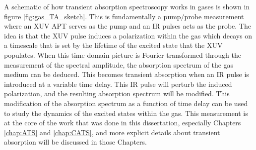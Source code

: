 A schematic of how transient absorption spectroscopy works in gases is shown in figure \ref{fig:gas_TA_sketch}.  This is fundamentally a pump/probe measurement where an XUV APT serves as the pump and an IR pulses acts as the probe.  The idea is that the XUV pulse induces a polarization within the gas which decays on a timescale that is set by the lifetime of the excited state that the XUV populates.  When this time-domain picture is Fourier transformed through the measurement of the spectral amplitude, the absorption spectrum of the gas medium can be deduced.  This becomes transient absorption when an IR pulse is introduced at a variable time delay.  This IR pulse will perturb the induced polarization, and the resulting absorption spectrum will be modified.  This modification of the absorption spectrum as a function of time delay can be used to study the dynamics of the excited states within the gas.  This measurement is at the core of the work that was done in this dissertation, especially Chapters \ref{chap:ATS} and \ref{chap:CATS}, and more explicit details about transient absorption will be discussed in those Chapters.

